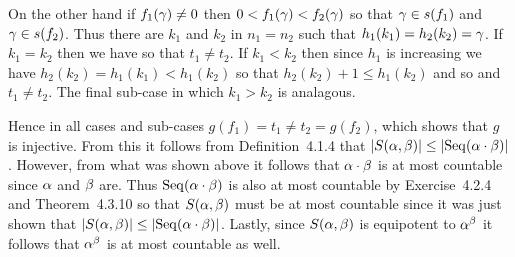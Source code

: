\begin{solution}
  On the other hand if $f_1(\gamma) \neq 0$ then $0 < f_1(\gamma) < f_2(\gamma)$ so that $\gamma \in s(f_1)$ and $\gamma \in s(f_2)$.
  Thus there are $k_1$ and $k_2$ in $n_1 = n_2$ such that $h_1(k_1) = h_2(k_2) = \gamma$.
  If $k_1 = k_2$ then we have
  so that $t_1 \neq  t_2$.
  If $k_1 < k_2$ then since $h_1$ is increasing we have $h_2(k_2) = h_1(k_1) < h_1(k_2)$ so that $h_2(k_2) + 1 \leq h_1(k_2)$ and so
  and $t_1 \neq t_2$.
  The final sub-case in which $k_1 > k_2$ is analagous.
  
  Hence in all cases and sub-cases $g(f_1) = t_1 \neq t_2 = g(f_2)$, which shows that $g$ is injective.
  From this it follows from Definition~4.1.4 that $\left| S(\alpha, \beta) \right| \leq \left| \mathrm{Seq}(\alpha \cdot \beta) \right|$.
  However, from what was shown above it follows that $\alpha \cdot \beta$ is at most countable since $\alpha$ and $\beta$ are.
  Thus $\mathrm{Seq}(\alpha \cdot \beta)$ is also at most countable by Exercise~4.2.4 and Theorem~4.3.10 so that $S(\alpha, \beta)$ must be at most countable since it was just shown that $\left| S(\alpha, \beta) \right| \leq \left| \mathrm{Seq}(\alpha \cdot \beta) \right|$.
  Lastly, since $S(\alpha, \beta)$ is equipotent to $\alpha^\beta$ it follows that $\alpha^\beta$ is at most countable as well. \qedsymbol
\end{solution}

\def\ex{7.1.3}
\setcounter{itm}{0}
\question{\ex}

